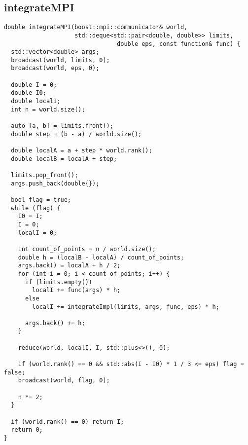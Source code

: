 \documentclass[12pt]{article}
\begin{document}
\subsection{integrateMPI}
\begin{verbatim}
double integrateMPI(boost::mpi::communicator& world,
                    std::deque<std::pair<double, double>> limits,
                                double eps, const function& func) {
  std::vector<double> args;
  broadcast(world, limits, 0);
  broadcast(world, eps, 0);

  double I = 0;
  double I0;
  double localI;
  int n = world.size();

  auto [a, b] = limits.front();
  double step = (b - a) / world.size();

  double localA = a + step * world.rank();
  double localB = localA + step;

  limits.pop_front();
  args.push_back(double{});

  bool flag = true;
  while (flag) {
    I0 = I;
    I = 0;
    localI = 0;

    int count_of_points = n / world.size();
    double h = (localB - localA) / count_of_points;
    args.back() = localA + h / 2;
    for (int i = 0; i < count_of_points; i++) {
      if (limits.empty())
        localI += func(args) * h;
      else
        localI += integrateImpl(limits, args, func, eps) * h;

      args.back() += h;
    }

    reduce(world, localI, I, std::plus<>(), 0);

    if (world.rank() == 0 && std::abs(I - I0) * 1 / 3 <= eps) flag = false;
    broadcast(world, flag, 0);

    n *= 2;
  }

  if (world.rank() == 0) return I;
  return 0;
}
\end{verbatim}
\end{document}
